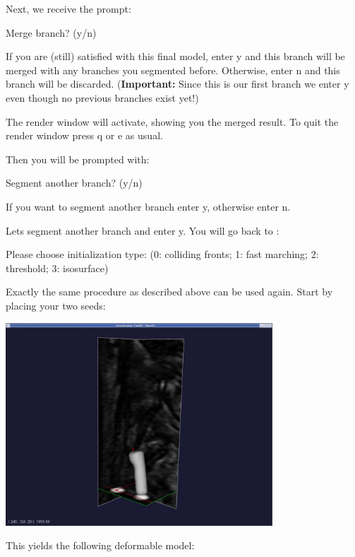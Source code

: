 Next, we receive the prompt\+: 
\begin{DoxyCode}
Merge branch? (y/n)
\end{DoxyCode}


If you are (still) satisfied with this final model, enter {\ttfamily y} and this branch will be merged with any branches you segmented before. Otherwise, enter {\ttfamily n} and this branch will be discarded. ({\bfseries Important\+:} Since this is our first branch we enter {\ttfamily y} even though no previous branches exist yet!)

The render window will activate, showing you the merged result. To quit the render window press {\ttfamily q} or {\ttfamily e} as usual.

Then you will be prompted with\+: 
\begin{DoxyCode}
Segment another branch? (y/n)
\end{DoxyCode}


If you want to segment another branch enter {\ttfamily y}, otherwise enter {\ttfamily n}.

Let\textquotesingle{}s segment another branch and enter {\ttfamily y}. You will go back to \+: 
\begin{DoxyCode}
Please choose initialization type: (0: colliding fronts; 1: fast
marching; 2: threshold; 3: isosurface)
\end{DoxyCode}


Exactly the same procedure as described above can be used again. Start by placing your two seeds\+:

 
\begin{DoxyImageNoCaption}
  \mbox{\includegraphics[width=0.75\textwidth]{seed4}}
\end{DoxyImageNoCaption}


This yields the following deformable model\+:

